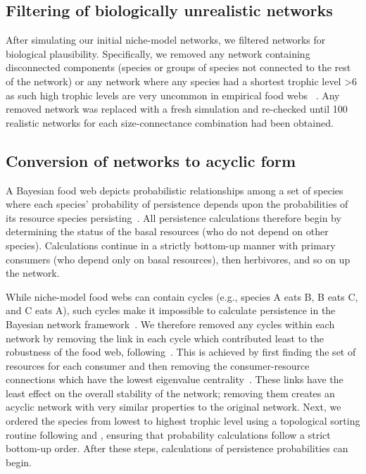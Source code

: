 \documentclass[12pt]{article}
\begin{document}
\begin{spacing}{2.0}
    
    \subsection{Filtering of biologically unrealistic networks}

        After simulating our initial niche-model networks, we filtered networks for biological plausibility.
        Specifically, we removed any network containing disconnected components (species or groups of species not connected to the rest of the network) or any network where any species had a shortest trophic level \textgreater6 as such high trophic levels are very uncommon in empirical food webs ~\citep{Riede2011}.
        Any removed network was replaced with a fresh simulation and re-checked until 100 realistic networks for each size-connectance combination had been obtained.
    

    \subsection{Conversion of networks to acyclic form}

        A Bayesian food web depicts probabilistic relationships among a set of species where each species' probability of persistence depends upon the probabilities of its resource species persisting~\citep{Jensen_Nielsen,Eklof2013}. 
        All persistence calculations therefore begin by determining the status of the basal resources (who do not depend on other species).
        Calculations continue in a strictly bottom-up manner with primary consumers (who depend only on basal resources), then herbivores, and so on up the network.

            
        While niche-model food webs can contain cycles (e.g., species A eats B, B eats C, and C eats A), such cycles make it impossible to calculate persistence in the Bayesian network framework~\citep{Tarjan1972}. 
        We therefore removed any cycles within each network by removing the link in each cycle which contributed least to the robustness of the food web, following~\citet{Allesina2009functional}.
        This is achieved by first finding the set of resources for each consumer and then removing the consumer-resource connections which have the lowest eigenvalue centrality~\citep{Allesina2009functional}.
        These links have the least effect on the overall stability of the network; removing them creates an acyclic network with very similar properties to the original network.
        Next, we ordered the species from lowest to highest trophic level using a topological sorting routine following \citet{Tarjan1972} and \citet{Allesinaetal2005}, ensuring that probability calculations follow a strict bottom-up order. 
        After these steps, calculations of persistence probabilities can begin.
        


\end{spacing}
\end{document}
